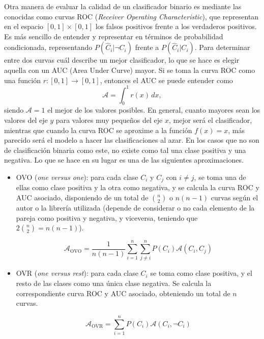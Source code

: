				Otra manera de evaluar la calidad de un clasificador binario es mediante las conocidas como curvas ROC (\textit{Receiver Operating Characteristic}), que representan en el espacio $[0, 1]\times[0, 1]$ los falsos positivos frente a los verdaderos positivos\cite{roc}. Es más sencillo de entender y representar en términos de probabilidad condicionada, representando $P(\hat{C}_i | \lnot C_i)$ frente a $P(\hat{C}_i | C_i)$. Para determinar entre dos curvas cuál describe un mejor clasificador, lo que se hace es elegir aquella con un AUC (Area Under Curve) mayor. Si se toma la curva ROC como una función $r: [0, 1] \longrightarrow [0, 1]$, entonces el AUC se puede entender como 
				$$
				\mathcal{A} = \int_0^1 r(x)\,dx, 
				$$
				siendo $\mathcal{A} = 1$ el mejor de los valores posibles. En general, cuanto mayores sean los valores del eje $y$ para valores muy pequeños del eje $x$, mejor será el clasificador, mientras que cuando la curva ROC se aproxime a la función $f(x) = x$, más parecido será el modelo a hacer las clasificaciones al azar. En los casos que no son de clasificación binaria como este, no existe como tal una clase positiva y una negativa. Lo que se hace en su lugar es una de las siguientes aproximaciones\cite{auc}. 
				
				\begin{itemize}
					\item OVO (\textit{one versus one}): para cada clase $C_i$ y $C_j$ con $i \neq j$, se toma una de ellas como clase positiva y la otra como negativa, y se calcula la curva ROC y AUC asociado, disponiendo de un total de $\binom{n}{2}$ o $n(n-1)$ curvas según el autor o la librería utilizada (depende de considerar o no cada elemento de la pareja como positiva y negativa, y viceversa, teniendo que $2\binom{n}{2} = n(n-1)$). 
					
					$$
					\mathcal{A}_{\text{OVO}} = \frac{1}{n(n-1)}\sum_{i=1}^n\sum_{j \neq i}^n P(C_i)\mathcal{A}(C_i, C_j)
					$$
					
					\item OVR (\textit{one versus rest}): para cada clase $C_i$ se toma como clase positiva, y el resto de las clases como una única clase negativa. Se calcula la correspondiente curva ROC y AUC asociado, obteniendo un total de $n$ curvas. 
					
					$$
					\mathcal{A}_{\text{OVR}} = \sum_{i=1}^n P(C_i)\mathcal{A}(C_i, \lnot C_i)
					$$
					
				\end{itemize}
				

